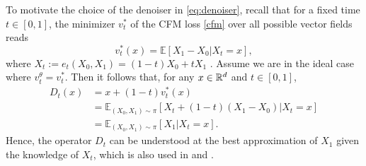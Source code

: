 \documentclass{article} %
\theoremstyle{definition}
\begin{document}
To motivate the choice of the denoiser in \eqref{eq:denoiser}, recall  that for a fixed time $t \in [0, 1]$, the minimizer $v_t^*$ of the CFM loss \eqref{cfm} over all possible vector fields reads 
\begin{equation}
    v_t^* (x) = \mathbb{E}[X_1 - X_0|X_t = x],
\end{equation}
where $X_t := e_t(X_0, X_1) = (1-t) X_0 + t X_1$ \citep{benton2024error,liu2023flow}. Assume we are in the ideal case where $v_t^\theta= v_t^*$.
%
Then it follows that, for any $x \in \mathbb{R}^d$ and $t \in [0,1]$,
\begin{align}
      D_t (x) & = x + (1-t) v^*_t(x)  \label{helper}\\
      & = \mathbb E_{(X_0, X_1) \sim \pi} \left[ X_t + (1-t) (X_1 - X_0) | X_t = x\right] \nonumber \\
      & = \mathbb E_{(X_0, X_1) \sim \pi} \left[ X_1 | X_t = x \right] .
\end{align}
Hence, the operator $D_t$ can be understood at the best approximation of $X_1$ given the knowledge of $X_t$, which is also used in \citet{pokle2024trainingfree} and  \citet{zhang2024flow}. 
\color{black}
%
\end{document}
